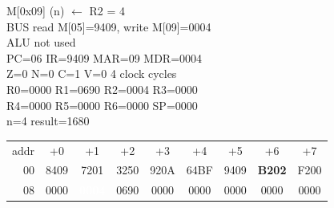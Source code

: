 \begin{tcolorbox}[stepbox, title={Step 21 \hfill PC 05 \quad ST R2, n}]
M[0x09] (n) $\leftarrow$ R2 = 4\\
\textcolor{dim}{BUS} read M[05]=9409, \textcolor{wrt}{write M[09]=0004}\\
\textcolor{dim}{ALU} \textcolor{dim}{not used}\\
PC=06 IR=9409 MAR=09 MDR=0004\\
Z=0 N=0 C=1 V=0 \hfill \textcolor{dim}{4 clock cycles}\\
R0=0000 R1=0690 R2=0004 R3=0000\\
R4=0000 R5=0000 R6=0000 SP=0000\\
\textcolor{dim}{n=4  result=1680}\\[1pt]
{\setlength{\tabcolsep}{1.6pt}\begin{tabular}{@{}r*{8}{c}@{}}
\textcolor{dim}{addr} & \textcolor{dim}{+0} & \textcolor{dim}{+1} & \textcolor{dim}{+2} & \textcolor{dim}{+3} & \textcolor{dim}{+4} & \textcolor{dim}{+5} & \textcolor{dim}{+6} & \textcolor{dim}{+7}\\
\textcolor{dim}{00} & 8409 & 7201 & 3250 & 920A & 64BF & 9409 & \cellcolor{pcc}\textbf{B202} & F200\\
\textcolor{dim}{08} & 0000 & \cellcolor{wrt}\textcolor{white}{\textbf{0004}} & \cellcolor{datac}0690 & 0000 & 0000 & 0000 & 0000 & 0000\\
\end{tabular}}
\end{tcolorbox}\par\vspace{3pt}
